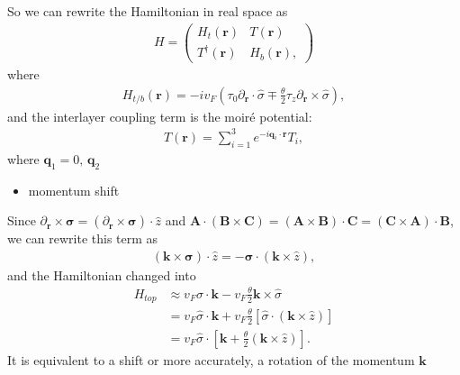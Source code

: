 \documentclass[10pt, oneside]{article}
\newcommand{\te}{\theta}
\newcommand{\p}[1]{\left(#1\right)}
\newcommand{\bb}[1]{\left[#1\right]}
\begin{document}
So we can rewrite the Hamiltonian in real space as
\begin{align}
	H  = \begin{pmatrix}
		H_{t} \p{\bm{r}} & T\p{\bm{r}} \\
		T^{\dagger} \p{\bm{r}} & H_{b} \p{\bm{r}},
	\end{pmatrix}
\end{align}
where 
\begin{align}
	H_{t/b} \p{\bm{r}} = -i v_{F} \p{\tau_0 \partial_{\bm{r}} \cdot \hat{\sigma} \mp \frac{\te}{2} \tau_z \partial_{\bm{r}} \times \hat{\sigma}},
\end{align}
and the interlayer coupling term is the moiré potential:
\begin{align}
	T\p{\bm{r}} = \sum_{i = 1}^{3} e^{-i \bm{q}_{i} \cdot \bm{r}} T_{i},
\end{align}
where \(\bm{q}_1 = 0,\, \bm{q}_2\)

\begin{itemize}
	\item momentum shift
\end{itemize}
Since \(\partial_{\bm{r}} \times \bm{\sigma} = \p{\partial_{\bm{r}} \times \bm{\sigma}} \cdot \hat{z}\) and \(\bm{A} \cdot \p{\bm{B} \times \bm{C}} = \p{\bm{A} \times \bm{B}} \cdot \bm{C} = \p{\bm{C} \times \bm{A}} \cdot \bm{B}\), we can rewrite this term as  
\begin{align}
	\p{\bm{k} \times \bm{\sigma}} \cdot \hat{z} = - \bm{\sigma} \cdot \p{\bm{k} \times \hat{z}},
\end{align}
and the Hamiltonian changed into 
\begin{align}
	H_{top} & \approx  v_{F} \hat{\sigma} \cdot \bm{k} - v_{F} \frac{\te}{2} \bm{k} \times \hat{\sigma} \\
	& = v_{F} \hat{\sigma} \cdot \bm{k} + v_{F} \frac{\te}{2} \bb{\hat{\sigma} \cdot \p{\bm{k} \times \hat{z}} } \\
	& = v_{F} \hat{\sigma} \cdot \bb{\bm{k} + \frac{\te}{2} \p{\bm{k} \times \hat{z}} }.
\end{align}
It is equivalent to a shift or more accurately, a rotation of the momentum \(\bm{k}\)
\end{document}
